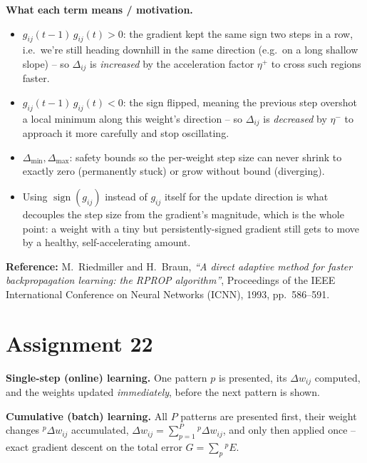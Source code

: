 \documentclass[11pt,a4paper]{article}
\begin{document}
\textbf{What each term means / motivation.}
\begin{itemize}
  \item $g_{ij}(t-1)\,g_{ij}(t)>0$: the gradient kept the same sign two steps in a row, i.e.\ we're
  still heading downhill in the same direction (e.g.\ on a long shallow slope) -- so $\Delta_{ij}$ is
  \emph{increased} by the acceleration factor $\eta^+$ to cross such regions faster.
  \item $g_{ij}(t-1)\,g_{ij}(t)<0$: the sign flipped, meaning the previous step overshot a local
  minimum along this weight's direction -- so $\Delta_{ij}$ is \emph{decreased} by $\eta^-$ to approach
  it more carefully and stop oscillating.
  \item $\Delta_{\min},\Delta_{\max}$: safety bounds so the per-weight step size can never shrink to
  exactly zero (permanently stuck) or grow without bound (diverging).
  \item Using $\operatorname{sign}(g_{ij})$ instead of $g_{ij}$ itself for the update direction is what
  decouples the step size from the gradient's magnitude, which is the whole point: a weight with a
  tiny but persistently-signed gradient still gets to move by a healthy, self-accelerating amount.
\end{itemize}

\textbf{Reference:} M.\ Riedmiller and H.\ Braun, \emph{``A direct adaptive method for faster
backpropagation learning: the RPROP algorithm''}, Proceedings of the IEEE International Conference on
Neural Networks (ICNN), 1993, pp.\ 586--591.

\section*{Assignment 22}

\textbf{Single-step (online) learning.} One pattern $p$ is presented, its $\Delta w_{ij}$ computed, and
the weights updated \emph{immediately}, before the next pattern is shown.

\textbf{Cumulative (batch) learning.} All $P$ patterns are presented first, their weight changes
${}^p\Delta w_{ij}$ accumulated, $\Delta w_{ij}=\sum_{p=1}^P {}^p\Delta w_{ij}$, and only then applied
once -- exact gradient descent on the total error $G=\sum_p {}^pE$.
\end{document}
